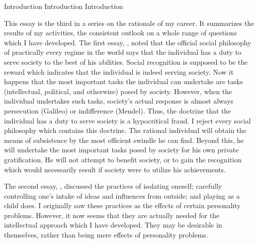 

\Chp
{Introduction}
{Introduction}
{Introduction}

This essay is the third in a series on the rationale of my career. It 
summarizes the results of my activities, the consistent outlook on a whole 
range of questions which I have developed. The first essay, 
, noted that the official social philosophy of practically every 
regime in the world says that the individual has a duty to serve society to the 
best of his abilities. Social recognition is supposed to be the reward which 
indicates that the individual is indeed serving society. Now it happens that 
the most important tasks the individual can undertake are tasks (intellectual, 
political, and otherwise) posed by society. However, when the individual 
undertakes such tasks, society's actual response is almost always persecution 
(Galileo) or indifference (Mendel). Thus, the doctrine that the individual has 
a duty to serve society is a hypocritical fraud. I reject every social 
philosophy which contains this doctrine. The rational individual will obtain 
the means of subsistence by the most efficient swindle he can find. Beyond 
this, he will undertake the most important tasks posed by society for his 
own private gratification. He will not attempt to benefit society, or to gain 
the recognition which would necessarily result if society were to utilize his 
achievements. 

The second essay, , discussed the practices of isolating oneself; 
carefully controlling one's intake of ideas and influences from outside; and 
playing as a child does. I originally saw these practices as the effects of 
certain personality problems. However, it now seems that they are actually 
needed for the intellectual approach which I have developed. They may be 
desirable in themselves, rather than being mere effects of personality 
problems. 

